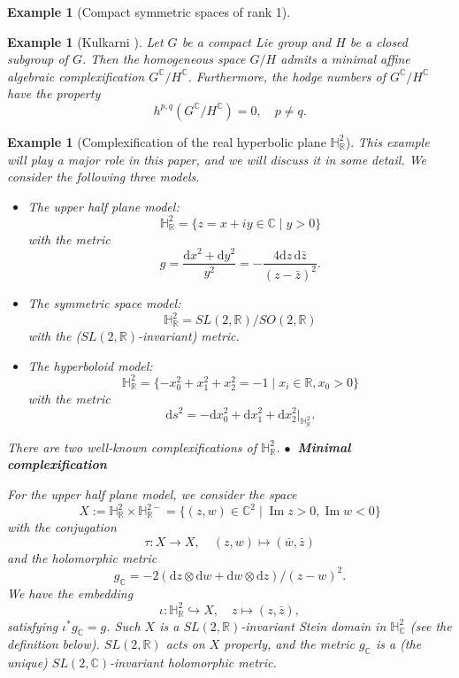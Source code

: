 \documentclass[11pt]{amsart}
\theoremstyle{plain}
\newtheorem{eg}[thm]{Example}
\theoremstyle{definition}
\newcommand{\R}{\mathbb{R}}
\newcommand{\C}{\mathbb{C}}
\newcommand{\dd}{\mathrm d}
\newcommand{\HH}{\mathbb{H}}
\DeclareMathOperator{\im}{Im}
\begin{document}
\begin{eg}[Compact symmetric spaces of rank 1]
\end{eg}

\begin{eg}[Kulkarni \cite{Ku}]
Let $G$ be a compact Lie group and $H$ be a closed subgroup of $G$. Then the homogeneous space $G/H$ admits a minimal affine algebraic complexification $G^{\C}/H^{\C}$. Furthermore, 
the hodge numbers of $G^{\C}/H^{\C}$ have the property
\[h^{p,q}(G^{\C}/H^{\C})=0,\quad p\neq q.\]
\end{eg}



\begin{eg}[Complexification of the real hyperbolic plane $\HH_{\R}^2$] This example will play a major role in this paper, and we will discuss it in some detail. We consider the following three models.
\begin{itemize}
\item[$(1)$] The upper half plane model: 
\[\HH_{\R}^2=\{z=x+iy\in\C\mid y>0\}\] 
with the metric
\[g=\frac{\dd x^2+\dd y^2}{y^2}=-\frac{4\dd z\,\dd\bar{z}}{(z-\bar{z})^2}.\]
\item[$(2)$] The symmetric space model: \[\HH_{\R}^2=SL(2,\R)/SO(2,\R)\]
with the ($SL(2,\R)$-invariant) metric.
\item[$(3)$] The hyperboloid model: 
\[\HH_{\R}^2=\{-x_0^2+x_1^2+x_2^2=-1\mid x_i\in\R, x_0>0\}\] 
with the metric
\[\dd s^2=-\dd x_0^2+\dd x_1^2+\dd x_2^2\big|_{\HH_{\R}^2}.\]
\end{itemize}

There are two well-known complexifications of $\HH_{\R}^2$.
\vskip 0.1cm
\noindent$\bullet~$ \textbf{Minimal complexification}

\vskip 0.1cm
For the upper half plane model, we consider the space 
\[X:=\HH_{\R}^2\times\HH_{\R}^{2-}=\{(z,w)\in\C^2\mid \im z>0,\im w<0\}\]
with the conjugation
\[\tau:X\rightarrow X, \quad (z,w)\mapsto(\bar{w},\bar{z})\]
and the holomorphic metric
\[g_{\C}=-2(\dd z\otimes \dd w+\dd w\otimes \dd z)/(z-w)^2.\]
We have the embedding 
\[\iota:\HH_{\R}^2\hookrightarrow X,\quad z\mapsto(z,\bar{z}),\]
satisfying $\iota^*g_{\C}=g$. Such $X$ is a $SL(2,\R)$-invariant Stein domain in $\HH_{\C}^2$ (see the definition below).  $SL(2,\R)$ acts on $X$ properly, and the metric $g_{\C}$ is a (the unique) $SL(2,\C)$-invariant holomorphic metric. 



\end{eg}
\end{document}
